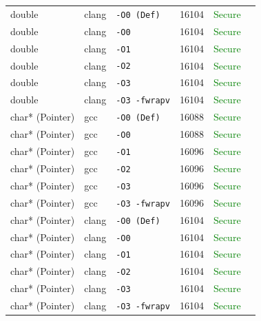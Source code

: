 \begin{table}[htbp]
\begin{tabular}{@{}lllcrl@{}}
double & clang & \texttt{-O0 (Def)} & 16104 & \textcolor{green}{Secure}} \\
double & clang & \texttt{-O0} & 16104 & \textcolor{green}{Secure}} \\
double & clang & \texttt{-O1} & 16104 & \textcolor{green}{Secure}} \\
double & clang & \texttt{-O2} & 16104 & \textcolor{green}{Secure}} \\
double & clang & \texttt{-O3} & 16104 & \textcolor{green}{Secure}} \\
double & clang & \texttt{-O3 -fwrapv} & 16104 & \textcolor{green}{Secure}} \\
\midrule
char* (Pointer) & gcc & \texttt{-O0 (Def)} & 16088 & \textcolor{green}{Secure}} \\
char* (Pointer) & gcc & \texttt{-O0} & 16088 & \textcolor{green}{Secure}} \\
char* (Pointer) & gcc & \texttt{-O1} & 16096 & \textcolor{green}{Secure}} \\
char* (Pointer) & gcc & \texttt{-O2} & 16096 & \textcolor{green}{Secure}} \\
char* (Pointer) & gcc & \texttt{-O3} & 16096 & \textcolor{green}{Secure}} \\
char* (Pointer) & gcc & \texttt{-O3 -fwrapv} & 16096 & \textcolor{green}{Secure}} \\
char* (Pointer) & clang & \texttt{-O0 (Def)} & 16104 & \textcolor{green}{Secure}} \\
char* (Pointer) & clang & \texttt{-O0} & 16104 & \textcolor{green}{Secure}} \\
char* (Pointer) & clang & \texttt{-O1} & 16104 & \textcolor{green}{Secure}} \\
char* (Pointer) & clang & \texttt{-O2} & 16104 & \textcolor{green}{Secure}} \\
char* (Pointer) & clang & \texttt{-O3} & 16104 & \textcolor{green}{Secure}} \\
char* (Pointer) & clang & \texttt{-O3 -fwrapv} & 16104 & \textcolor{green}{Secure}} \\
\midrule
\bottomrule \end{tabular} \end{table}
